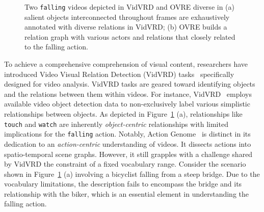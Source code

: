 \documentclass[letterpaper]{article}
\begin{document}
\begin{figure}
\centering
{}
\caption{Two \texttt{falling} videos depicted in VidVRD and OVRE diverse in (a) salient objects interconnected throughout frames are exhaustively annotated with diverse relations in VidVRD; (b) OVRE builds a relation graph with various actors and relations that closely related to the falling action.
}
\label{fig:compare_anno}
\end{figure}

To achieve a comprehensive comprehension of visual content, researchers have introduced Video Visual Relation Detection (VidVRD) tasks~\cite{Shang2017VideoVR,shang2019annotating} specifically designed for video analysis. VidVRD tasks are geared toward identifying objects and the relations between them within videos.
For instance, VidVRD~\cite{Shang2017VideoVR} employs available video object detection data to non-exclusively label various simplistic relationships between objects. As depicted in Figure~\ref{fig:compare_anno} (a), relationships like \texttt{touch} and \texttt{watch} are inherently \emph{object-centric} relationships with limited implications for the \texttt{falling} action.
Notably, Action Genome~\cite{genome} is distinct in its dedication to an \emph{action-centric} understanding of videos. It dissects actions into spatio-temporal scene graphs. However, it still grapples with a challenge shared by VidVRD  the constraint of a fixed vocabulary range. Consider the scenario shown in Figure~\ref{fig:compare_anno} (a) involving a bicyclist falling from a steep bridge. Due to the vocabulary limitations, the description fails to encompass the bridge and its relationship with the biker, which is an essential element in understanding the falling action.
\end{document}
